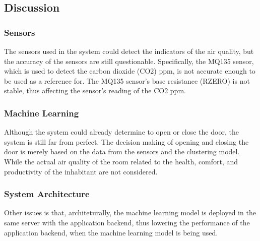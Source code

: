 \subsection{Discussion}
\subsubsection{Sensors}
The sensors used in the system could detect the
indicators of the air quality, but the accuracy
of the sensors are still questionable.
Specifically, the MQ135 sensor, which is used to
detect the carbon dioxide (CO2) ppm, is not
accurate enough to be used as a reference for.
The MQ135 sensor's base resistance (RZERO) is
not stable, thus affecting the sensor's
reading of the CO2 ppm.

\subsubsection{Machine Learning}
Although the system could already determine to open
or close the door, the system is still far from
perfect. The decision making of opening and closing
the door is merely based on the data from the
sensors and the clustering model. While the actual
air quality of the room related to the health,
comfort, and productivity of the inhabitant are not
considered.

\subsubsection{System Architecture}
Other issues is that, architeturally, the machine
learning model is deployed in the same server with
the application backend, thus lowering the
performance of the application backend, when the
machine learning model is being used.